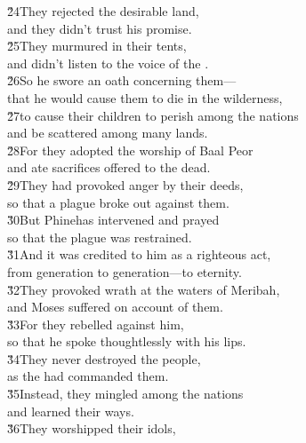 \begin{poetry}
\poeml \v{24}They rejected the desirable land, \\
\poemll    and they didn't trust his promise. \\
\poeml \v{25}They murmured in their tents, \\
\poemll    and didn't listen to the voice of the . \\
\poeml \v{26}So he swore an oath concerning them--- \\
\poemll    that he would cause them to die in the wilderness, \\
\poeml \v{27}to cause their children to perish among the nations \\
\poemll    and be scattered among many lands. \\
\poeml \v{28}For they adopted the worship of Baal Peor \\
\poemll    and ate sacrifices offered to the dead. \\
\poeml \v{29}They had provoked anger by their deeds, \\
\poemll    so that a plague broke out against them. \\
\poeml \v{30}But Phinehas intervened and prayed \\
\poemll    so that the plague was restrained. \\
\poeml \v{31}And it was credited to him as a righteous act, \\
\poemll    from generation to generation---to eternity. \\
\poeml \v{32}They provoked wrath at the waters of Meribah, \\
\poemll    and Moses suffered on account of them. \\
\poeml \v{33}For they rebelled against him, \\
\poemll    so that he spoke thoughtlessly with his lips. \\
\poeml \v{34}They never destroyed the people, \\
\poemll    as the  had commanded them. \\
\poeml \v{35}Instead, they mingled among the nations \\
\poemll    and learned their ways. \\
\poeml \v{36}They worshipped their idols, \\

\end{poetry}
